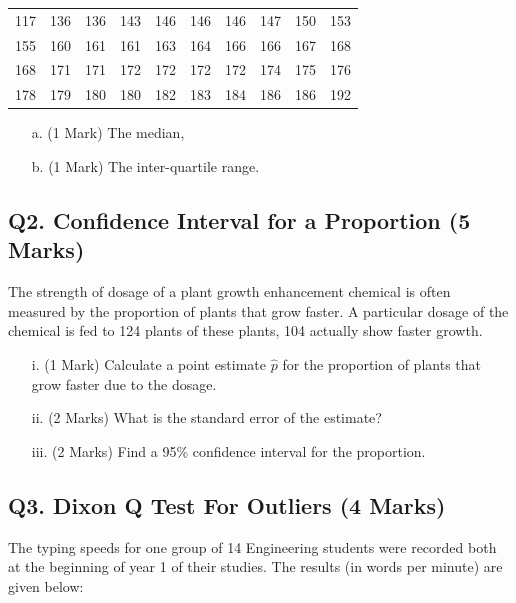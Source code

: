 \documentclass[a4paper,12pt]{article}
\begin{document}
\begin{table}[ht]
	\begin{center}
		\begin{tabular}{|rrrrrrrrrr|}
			
			\hline
			117& 136& 136& 143& 146& 146& 146& 147& 150& 153\\
			155& 160& 161& 161& 163& 164& 166& 166& 167& 168\\
			168& 171& 171& 172& 172& 172& 172& 174& 175& 176\\
			178& 179& 180& 180& 182& 183& 184& 186& 186& 192\\
			\hline
		\end{tabular}
	\end{center}
\end{table}
\vspace{-0.5cm}
\begin{itemize}
	\item[a.] (1 Mark) The median,
	\item[b.] (1 Mark) The inter-quartile range.
\end{itemize}




\subsection*{Q2. Confidence Interval for a Proportion (5 Marks)}
The strength of dosage of a plant growth enhancement chemical is often measured by the proportion of plants that grow faster. A particular dosage of the chemical is fed to 124 plants of these plants, 104 actually show faster growth.

\begin{itemize}
	\item[i.] (1 Mark) Calculate a point estimate $\hat{p}$ for the proportion of plants that grow faster due to the dosage. 									 
	\item[ii.] (2 Marks)  What is the standard error of the estimate? 			
	\item[iii.] (2 Marks) Find a 95\% confidence interval for the proportion. 					
\end{itemize}


\subsection*{Q3. Dixon Q Test For Outliers (4 Marks)}

The typing speeds for one group of 14 Engineering students were recorded both at the beginning of year 1 of their studies. The results (in words per minute) are given below:
\end{document}
